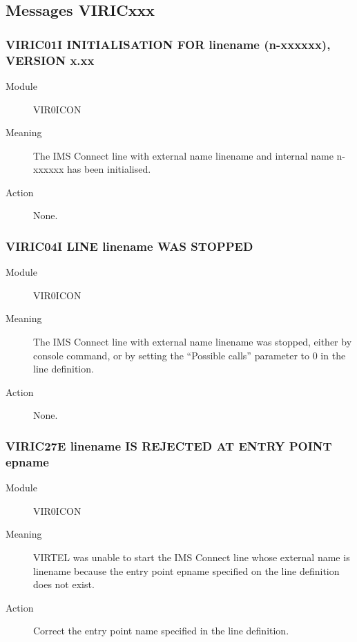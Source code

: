 \documentclass[letterpaper,10pt,english]{sphinxmanual}
\begin{document}
\subsection{Messages VIRICxxx}
\label{\detokenize{messages:messages-viricxxx}}

\subsubsection{VIRIC01I INITIALISATION FOR linename (n-xxxxxx), VERSION x.xx}
\label{\detokenize{messages:viric01i-initialisation-for-linename-n-xxxxxx-version-x-xx}}\begin{description}
\item[{Module}] \leavevmode
VIR0ICON

\item[{Meaning}] \leavevmode
The IMS Connect line with external name linename and internal name n-xxxxxx has been initialised.

\item[{Action}] \leavevmode
None.

\end{description}


\subsubsection{VIRIC04I LINE linename WAS STOPPED}
\label{\detokenize{messages:viric04i-line-linename-was-stopped}}\begin{description}
\item[{Module}] \leavevmode
VIR0ICON

\item[{Meaning}] \leavevmode
The IMS Connect line with external name linename was stopped, either by console command, or by setting the “Possible calls” parameter to 0 in the line definition.

\item[{Action}] \leavevmode
None.

\end{description}


\subsubsection{VIRIC27E linename IS REJECTED AT ENTRY POINT epname}
\label{\detokenize{messages:viric27e-linename-is-rejected-at-entry-point-epname}}\begin{description}
\item[{Module}] \leavevmode
VIR0ICON

\item[{Meaning}] \leavevmode
VIRTEL was unable to start the IMS Connect line whose external name is linename because the entry point epname specified on the line definition does not exist.

\item[{Action}] \leavevmode
Correct the entry point name specified in the line definition.

\end{description}
\end{document}
